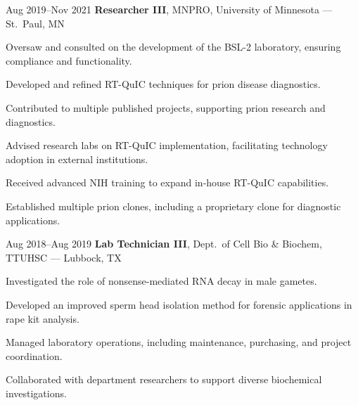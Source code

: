 \documentclass{resume}
\begin{document}
        \begin{twocolentry}{Aug 2019--Nov 2021}
            \textbf{Researcher III}, MNPRO, University of Minnesota --- St.\ Paul, MN
        \end{twocolentry}
        \begin{onecolentry}
            \begin{highlights}
                \item Oversaw and consulted on the development of the BSL-2 laboratory, ensuring compliance and functionality.
                \item Developed and refined RT-QuIC techniques for prion disease diagnostics.
                \item Contributed to multiple published projects, supporting prion research and diagnostics.
                \item Advised research labs on RT-QuIC implementation, facilitating technology adoption in external institutions.
                \item Received advanced NIH training to expand in-house RT-QuIC capabilities.
                \item Established multiple prion clones, including a proprietary clone for diagnostic applications.
            \end{highlights}
        \end{onecolentry}

        \begin{twocolentry}{Aug 2018--Aug 2019}
            \textbf{Lab Technician III}, Dept.\ of Cell Bio \& Biochem, TTUHSC --- Lubbock, TX
        \end{twocolentry}
        \begin{onecolentry}
            \begin{highlights}
                \item Investigated the role of nonsense-mediated RNA decay in male gametes.
                \item Developed an improved sperm head isolation method for forensic applications in rape kit analysis.
                \item Managed laboratory operations, including maintenance, purchasing, and project coordination.
                \item Collaborated with department researchers to support diverse biochemical investigations.
            \end{highlights}
        \end{onecolentry}
\end{document}

